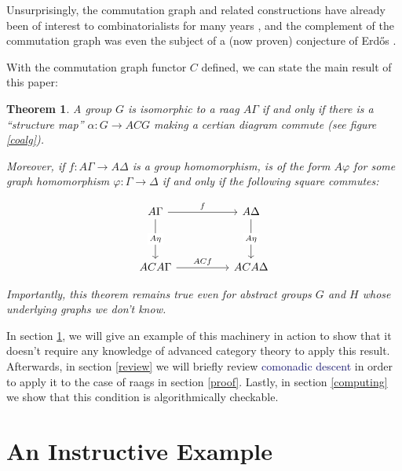 \documentclass[12pt]{article}
\newtheorem{thm}{Theorem}
\theoremstyle{definition}
\theoremstyle{theorem}
\newcommand*{\important}[1]{\textcolor{MidnightBlue}{#1}}
\begin{document}
  Unsurprisingly, the commutation graph and related constructions have already 
  been of interest to combinatorialists for many years 
  \cite{baumeisterCommutingGraphsOdd2009, 
  dolinarMaximalDistancesCommuting2010,
  giudiciDiametersCommutingGraphs2010,
  arvindRecognizingCommutingGraph2022,
  cameronGraphsDefinedGroups2021}, and the complement of the commutation 
  graph was even the subject of a (now proven) conjecture of Erd\H{o}s
  \cite{neumannProblemPaulErdos1976}.

  With the commutation graph functor $C$ defined, we can state the main result
  of this paper:

  \begin{thm}
      A group $G$ is isomorphic to a raag $A\Gamma$
      if and only if there is a ``structure map''
      $\alpha : G \to ACG$ making a certian diagram 
      commute (see figure \ref{coalg}).

      Moreover, if $f : A\Gamma \to A\Delta$ is a group homomorphism,
      is of the form $A \varphi$ for some graph homomorphism
      $\varphi : \Gamma \to \Delta$ if and only if the following square commutes:

      \[
          \begin{tikzcd}
          A\Gamma && A\Delta \\
          \\
          ACA\Gamma && ACA\Delta
          \arrow["f", from=1-1, to=1-3]
          \arrow["ACf", from=3-1, to=3-3]
          \arrow["{A \eta}"{description}, from=1-1, to=3-1]
          \arrow["A\eta"{description}, from=1-3, to=3-3]
          \end{tikzcd}
      \]

      Importantly, this theorem remains true 
      even for abstract groups $G$ and $H$ whose underlying graphs we don't know.
  \end{thm}

  In section \ref{eg}, we will give an example of this machinery in action
  to show that it doesn't require any knowledge of advanced category theory
  to apply this result. Afterwards, in section \ref{review} 
  we will briefly review \important{comonadic descent} in order to apply it
  to the case of raags in section \ref{proof}. Lastly, in section \ref{computing}
  we show that this condition is algorithmically checkable. 

\section{An Instructive Example}
\label{eg}
\end{document}
